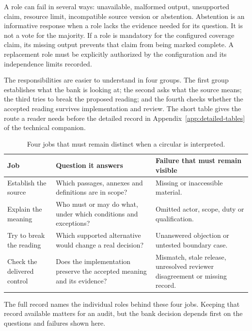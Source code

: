 \documentclass[12pt,a4paper,oneside,openany]{book}
\begin{document}
A role can fail in several ways: unavailable, malformed output, unsupported
claim, resource limit, incompatible source version or abstention. Abstention is
an informative response when a role lacks the evidence needed for its question.
It is not a vote for the majority. If a role is mandatory for the configured
coverage claim, its missing output prevents that claim from being marked complete.
A replacement role must be explicitly authorized by the configuration and its
independence limits recorded.

The responsibilities are easier to understand in four groups. The first group
establishes what the bank is looking at; the second asks what the source means;
the third tries to break the proposed reading; and the fourth checks whether the
accepted reading survives implementation and review. The short table gives the
route a reader needs before the detailed record in Appendix~\ref{app:detailed-tables} of the technical companion.

\begin{table}[H]
\centering
\caption{Four jobs that must remain distinct when a circular is interpreted.}
\label{tab:ensemble-roles}
\begin{tabularx}{\textwidth}{P{35mm}YY}
\toprule
Job & Question it answers & Failure that must remain visible\\
\midrule
Establish the source & Which passages, annexes and definitions are in scope? & Missing or inaccessible material.\\
\addlinespace[0.5em]
Explain the meaning & Who must or may do what, under which conditions and exceptions? & Omitted actor, scope, duty or qualification.\\
\addlinespace[0.5em]
Try to break the reading & Which supported alternative would change a real decision? & Unanswered objection or untested boundary case.\\
\addlinespace[0.5em]
Check the delivered control & Does the implementation preserve the accepted meaning and its evidence? & Mismatch, stale release, unresolved reviewer disagreement or missing record.\\
\bottomrule
\end{tabularx}
\end{table}

The full record names the individual roles behind these four jobs. Keeping that
record available matters for an audit, but the bank decision depends first on the
questions and failures shown here.
\end{document}
